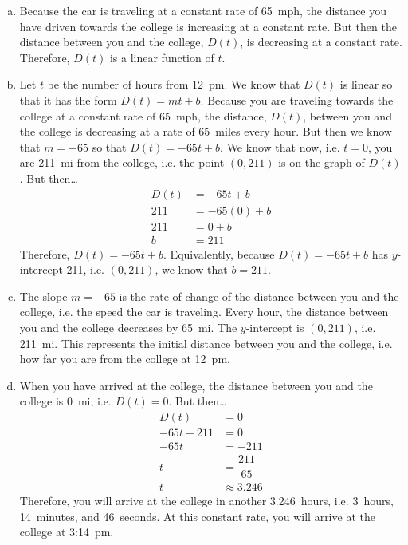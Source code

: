 \documentclass[11pt,letterpaper]{article}
\begin{document}
\sol
\begin{enumerate}[(a)]
\item Because the car is traveling at a constant rate of 65~mph, the distance you have driven towards the college is increasing at a constant rate. But then the distance between you and the college, $D(t)$, is decreasing at a constant rate. Therefore, $D(t)$ is a linear function of $t$.

\item Let $t$ be the number of hours from 12~pm. We know that $D(t)$ is linear so that it has the form $D(t)= mt + b$. Because you are traveling towards the college at a constant rate of 65~mph, the distance, $D(t)$, between you and the college is decreasing at a rate of 65~miles every hour. But then we know that $m= -65$ so that $D(t)= -65t + b$. We know that now, i.e. $t= 0$, you are 211~mi from the college, i.e. the point $(0, 211)$ is on the graph of $D(t)$. But then\dots
	\[
	\begin{aligned}
	D(t)&= -65t + b \\[0.3cm]
	211&= -65(0) + b \\[0.3cm]
	211&= 0 + b \\[0.3cm]
	b&= 211
	\end{aligned}
	\]
Therefore, $D(t)= -65t + b$. Equivalently, because $D(t)= -65t + b$ has $y$-intercept 211, i.e. $(0, 211)$, we know that $b= 211$. 

\item The slope $m= -65$ is the rate of change of the distance between you and the college, i.e. the speed the car is traveling. Every hour, the distance between you and the college decreases by 65~mi. The $y$-intercept is $(0, 211)$, i.e. 211~mi. This represents the initial distance between you and the college, i.e. how far you are from the college at 12~pm. 

\item When you have arrived at the college, the distance between you and the college is 0~mi, i.e. $D(t)= 0$. But then\dots
	\[
	\begin{aligned}
	D(t)&= 0 \\[0.3cm]
	-65t + 211&= 0 \\[0.3cm]
	-65t&= -211 \\[0.3cm]
	t&= \dfrac{211}{65} \\[0.3cm]
	t&\approx 3.246
	\end{aligned}
	\]
Therefore, you will arrive at the college in another 3.246~hours, i.e. 3~hours, 14~minutes, and 46~seconds. At this constant rate, you will arrive at the college at 3:14~pm. 
\end{enumerate}
\end{document}
